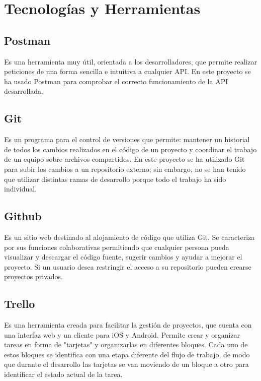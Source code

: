\chapter{Tecnologías y Herramientas} 
\label{sec:tecnologia}

\section{Postman}

Es una herramienta muy útil, orientada a los desarrolladores, que permite realizar peticiones de una forma sencilla e intuitiva a cualquier API. En este proyecto se ha usado Postman para comprobar el correcto funcionamiento de la API desarrollada.

\section{Git}

Es un programa para el control de versiones que permite: mantener un historial de todos los cambios realizados en el código de un proyecto y coordinar el trabajo de un equipo sobre archivos compartidos.
En este proyecto se ha utilizado Git para subir los cambios a un repositorio externo; sin embargo, no se han tenido que utilizar distintas ramas de desarrollo porque todo el trabajo ha sido individual.

\section{Github}

Es un sitio web destinado al alojamiento de código que utiliza Git. Se caracteriza por sus funciones colaborativas permitiendo que cualquier persona pueda visualizar y descargar el código fuente, sugerir cambios y ayudar a mejorar el proyecto. Si un usuario desea restringir el acceso a su repositorio pueden crearse proyectos privados.

\section{Trello}

Es una herramienta creada para facilitar la gestión de proyectos, que cuenta con una interfaz web y un cliente para iOS y Android. Permite crear y organizar tareas en forma de "tarjetas" y organizarlas en diferentes bloques. Cada uno de estos bloques se identifica con una etapa diferente del flujo de trabajo, de modo que durante el desarrollo las tarjetas se van moviendo de un bloque a otro para identificar el estado actual de la tarea. 


